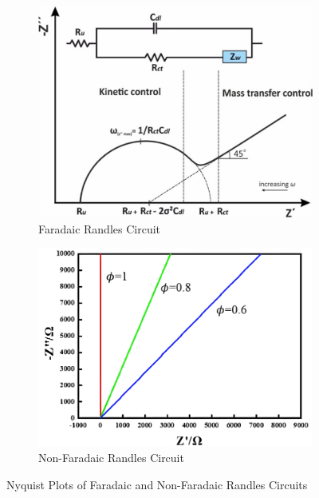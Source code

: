 \begin{figure}[H]
    \centering
    \begin{subfigure}{0.45\textwidth}
        \centering
        \includegraphics[width=\textwidth]{RandlesNyquist.jpeg}
        \caption[Faradaic Randles Circuit]{Faradaic Randles Circuit \cite{lazanasErratumElectrochemicalImpedance2025}}
        \label{fig:randles_nyquist_faradaic}
    \end{subfigure}
    \hfill
    \begin{subfigure}{0.45\textwidth}
        \centering
        \includegraphics[width=\textwidth]{RandlesNonFaradaicNyquist.png}
        \caption[Non-Faradaic Randles Circuit]{Non-Faradaic Randles Circuit \cite{xieReviewAdvancementsNanoscale2020a}}
        \label{fig:RandlesNonFaradaicNyquist}    
    \end{subfigure}
    \caption{Nyquist Plots of Faradaic and Non-Faradaic Randles Circuits}
    \label{fig:randles_nyquist}
\end{figure}

